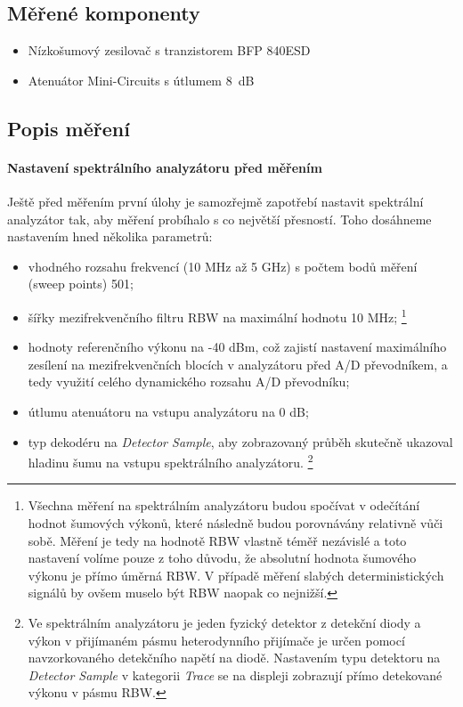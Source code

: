 \documentclass[11pt,a4paper]{article}
\begin{document}
\subsection*{Měřené komponenty}
\begin{itemize}
    \item Nízkošumový zesilovač s tranzistorem BFP 840ESD
    \item Atenuátor Mini-Circuits s útlumem 8~dB
\end{itemize}

\subsection*{Popis měření}
\paragraph*{Nastavení spektrálního analyzátoru před měřením} Ještě před měřením první úlohy je samozřejmě zapotřebí nastavit spektrální analyzátor tak, aby měření probíhalo s co největší přesností. Toho dosáhneme nastavením hned několika parametrů:
\begin{itemize}
    \item vhodného rozsahu frekvencí (10 MHz až 5 GHz) s počtem bodů měření (sweep points) 501;
    \item šířky mezifrekvenčního filtru RBW na maximální hodnotu 10 MHz;%
    \footnote{Všechna měření na spektrálním analyzátoru budou spočívat v odečítání hodnot šumových výkonů, které následně budou porovnávány relativně vůči sobě. Měření je tedy na hodnotě RBW vlastně téměř nezávislé a toto nastavení volíme pouze z toho důvodu, že absolutní hodnota šumového výkonu je přímo úměrná RBW. V případě měření slabých deterministických signálů by ovšem muselo být RBW naopak co nejnižší.}
    \item hodnoty referenčního výkonu na -40 dBm, což zajistí nastavení maximálního zesílení na mezifrekvenčních blocích v analyzátoru před A/D převodníkem, a tedy využití celého dynamického rozsahu A/D převodníku;
    \item útlumu atenuátoru na vstupu analyzátoru na 0 dB;
    \item typ dekodéru na \emph{Detector Sample},
    aby zobrazovaný průběh skutečně ukazoval hladinu šumu na vstupu spektrálního analyzátoru.%
        \footnote{Ve spektrálním analyzátoru je jeden fyzický detektor z detekční diody a výkon v přijímaném pásmu heterodynního přijímače je určen pomocí navzorkovaného detekčního napětí na diodě. Nastavením typu detektoru na \emph{Detector Sample} v kategorii \emph{Trace} se na displeji zobrazují přímo detekované výkonu v pásmu RBW.}
\end{itemize}
\end{document}
